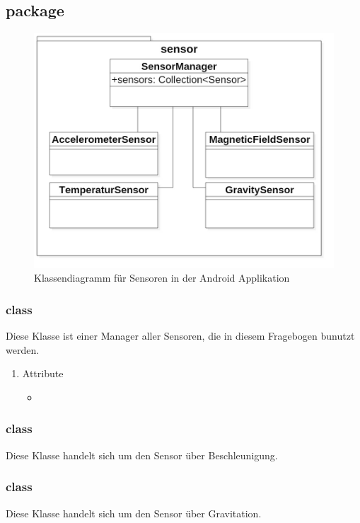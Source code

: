 \documentclass[a4paper]{scrreprt}
\begin{document}
            \subsection{package }
            \begin{figure}[H]
                \centering
                \includegraphics[scale = 0.5]{ClassDiagramAppSensor.jpg}
                \caption{Klassendiagramm für Sensoren in der Android Applikation }
            \end{figure}
                \subsubsection{class }
                Diese Klasse ist einer Manager aller Sensoren, die in diesem Fragebogen bunutzt werden.
                \begin{enumerate}
                  \item Attribute
                    \begin{itemize}
                      \item {}
                    \end{itemize}
                \end{enumerate}
                \subsubsection{class }
                Diese Klasse handelt sich um den Sensor über Beschleunigung.
                \subsubsection{class }
                Diese Klasse handelt sich um den Sensor über Gravitation.
\end{document}
